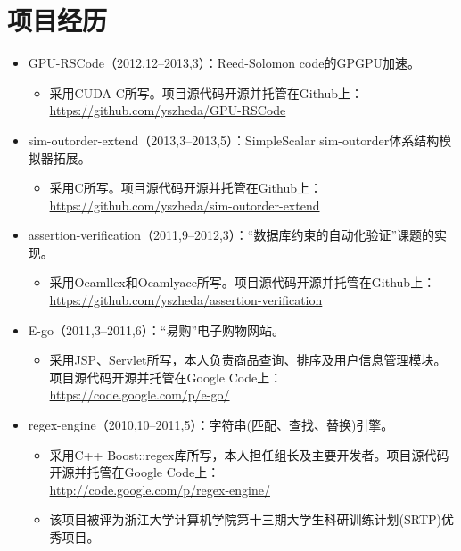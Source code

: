 \documentclass[letterpaper]{article}
\begin{document}
\section*{项目经历}
\begin{itemize}
  \item GPU-RSCode（2012,12--2013,3）：Reed-Solomon code的GPGPU加速。
	\begin{itemize}
	  \item 采用CUDA C所写。项目源代码开源并托管在Github上：\\
			  \url{https://github.com/yszheda/GPU-RSCode}
	\end{itemize}
  \item sim-outorder-extend（2013,3--2013,5）：SimpleScalar sim-outorder体系结构模拟器拓展。
	\begin{itemize}
	  \item 采用C所写。项目源代码开源并托管在Github上：\\
			  \url{https://github.com/yszheda/sim-outorder-extend}
	\end{itemize}
  \item assertion-verification（2011,9--2012,3）：``数据库约束的自动化验证''课题的实现。
	\begin{itemize}
	  \item 采用Ocamllex和Ocamlyacc所写。项目源代码开源并托管在Github上：\\
			  \url{https://github.com/yszheda/assertion-verification}
	\end{itemize}
  \item E-go（2011,3--2011,6）：``易购''电子购物网站。
	\begin{itemize}
	  \item 采用JSP、Servlet所写，本人负责商品查询、排序及用户信息管理模块。项目源代码开源并托管在Google Code上：\\
			  \url{https://code.google.com/p/e-go/}
	\end{itemize}
  \item regex-engine（2010,10--2011,5）：字符串(匹配、查找、替换)引擎。
    \begin{itemize}
	  \item 采用C++ Boost::regex库所写，本人担任组长及主要开发者。项目源代码开源并托管在Google Code上：\\
			  \url{http://code.google.com/p/regex-engine/}
      \item 该项目被评为浙江大学计算机学院第十三期大学生科研训练计划(SRTP)优秀项目。

\end{itemize}
\end{itemize}
\end{document}
